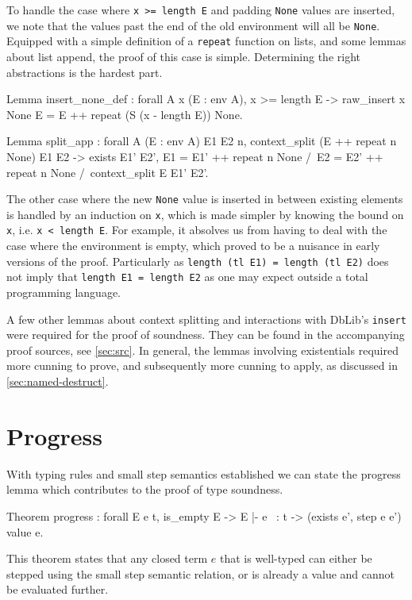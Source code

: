 \documentclass[]{unswthesis}
\let\c\texttt
\begin{document}
To handle the case where \c{x >= length E} and padding \c{None} values are inserted, we note that the values past the end of the old environment will all be \c{None}. Equipped with a simple definition of a \c{repeat} function on lists, and some lemmas about list append, the proof of this case is simple. Determining the right abstractions is the hardest part.

\newpage
\begin{coqcode}
Lemma insert_none_def : forall A x (E : env A),
  x >= length E ->
  raw_insert x None E = E ++ repeat (S (x - length E)) None.

Lemma split_app : forall A (E : env A) E1 E2 n,
    context_split (E ++ repeat n None) E1 E2 ->
    exists E1' E2',
      E1 = E1' ++ repeat n None /\
      E2 = E2' ++ repeat n None /\
      context_split E E1' E2'.
\end{coqcode}

The other case where the new \c{None} value is inserted in between existing elements is handled by an induction on \c{x}, which is made simpler by knowing the bound on \c{x}, i.e. \c{x < length E}. For example, it absolves us from having to deal with the case where the environment is empty, which proved to be a nuisance in early versions of the proof. Particularly as \c{length (tl E1) = length (tl E2)} does not imply that \c{length E1 = length E2} as one may expect outside a total programming language.

A few other lemmas about context splitting and interactions with DbLib's \c{insert} were required for the proof of soundness. They can be found in the accompanying proof sources, see \cref{sec:src}. In general, the lemmas involving existentials required more cunning to prove, and subsequently more cunning to apply, as discussed in \cref{sec:named-destruct}.

\section{Progress}
\label{sec:progress}

With typing rules and small step semantics established we can state the progress lemma which contributes to the proof of type soundness.

\begin{coqcode}
Theorem progress : forall E e t,
  is_empty E ->
  E |- e ~: t ->
  (exists e', step e e') \/ value e.
\end{coqcode}

This theorem states that any closed term $e$ that is well-typed can either be stepped using the small step semantic relation, or is already a value and cannot be evaluated further.
\end{document}
